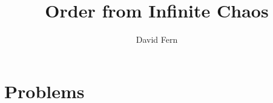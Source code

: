 \documentclass[11pt]{article}
\begin{document}
\title{Order from Infinite Chaos}
\author{David Fern}
\maketitle{}


\section*{Problems}

\newcommand{\src}{\tmpdir/my_cppFromLaTeX.cpp}
\newcommand{\exe}{\tmpdir/my_cppExeFromLaTeX.runme}
\end{document}
